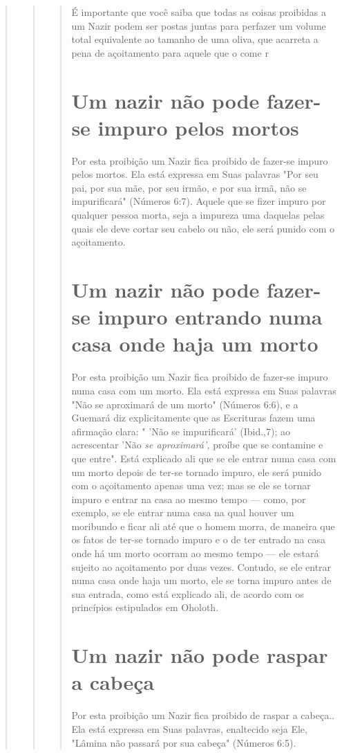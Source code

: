 \begin{quote}
\begin{quote}
\begin{quote}
É importante que você saiba que todas as coisas proibidas a um Na­zir
podem ser postas juntas para perfazer um volume total equivalente ao
tama­nho de uma oliva, que acarreta a pena de açoitamento para aquele
que o co­me r

\section{Um nazir não pode fazer-se impuro pelos mortos}

Por esta proibição um Nazir fica proibido de fazer-se impuro pelos
mortos. Ela está expressa em Suas palavras "Por seu pai, por sua mãe,
por seu irmão, e por sua irmã, não se impurificará" (Números 6:7).
Aquele que se fizer impuro por qualquer pessoa morta, seja a impureza
uma daquelas pelas quais ele deve cortar seu cabelo ou não, ele será
punido com o açoitamento.

\section{Um nazir não pode fazer-se impuro entrando numa casa onde haja um
morto}

Por esta proibição um Nazir fica proibido de fazer-se impuro numa casa
com um morto. Ela está expressa em Suas palavras "Não se aproximará de
um morto" (Números 6:6), e a Guemará diz explicitamente que as
Escrituras fazem uma afirmação clara: " 'Não se impurificará' (Ibid.,7);
ao acrescentar 'Não \emph{se aproximará',} proíbe que se contamine e que
entre". Está explicado ali que se ele entrar numa casa com um morto
depois de ter-se tornado impuro, ele será punido com o açoitamento
apenas uma vez; mas se ele se tornar impuro e entrar na casa ao mesmo
tempo --- como, por exemplo, se ele entrar numa casa na qual houver um
moribundo e ficar ali até que o homem morra, de ma­neira que os fatos de
ter-se tornado impuro e o de ter entrado na casa onde há um morto
ocorram ao mesmo tempo --- ele estará sujeito ao açoitamento por duas
vezes. Contudo, se ele entrar numa casa onde haja um morto, ele se torna
impuro antes de sua entrada, como está explicado ali, de acordo com os
princípios estipulados em Oholoth.

\section{Um nazir não pode raspar a cabeça}

Por esta proibição um Nazir fica proibido de raspar a cabeça.. Ela es­tá
expressa em Suas palavras, enaltecido seja Ele, "Lâmina não passará por
sua cabeça" (Números 6:5).


\end{quote}
\end{quote}
\end{quote}

